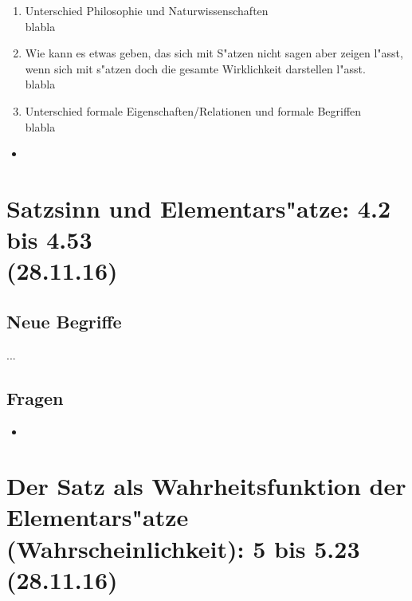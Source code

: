 \documentclass[emulatestandardclasses]{scrartcl}
\begin{document}
\begin{enumerate}
  \item {\color{NavyBlue}Unterschied Philosophie und Naturwissenschaften}\\
{\color{ForestGreen} blabla}
  \item {\color{NavyBlue} Wie kann es etwas geben, das sich mit S"atzen nicht sagen aber zeigen l"asst, wenn sich mit s"atzen doch die gesamte Wirklichkeit darstellen l"asst.}\\
{\color{ForestGreen} blabla}
    \item {\color{NavyBlue} Unterschied formale Eigenschaften/Relationen und formale Begriffen}\\
{\color{ForestGreen} blabla}
\end{enumerate}







\begin{itemize}
  \item 
\end{itemize}


\section{Satzsinn und Elementars"atze: 4.2 bis 4.53\\(28.11.16)}

\vspace{10pt}
\subsection{Neue Begriffe}


\begin{description}[leftmargin=!,labelwidth=\widthof{\bfseries Sachverhalt}]
  \item[Bild] ...
  \item[Tatsache] 
\end{description}

\subsection{Fragen}

\begin{itemize}
  \item 
\end{itemize}


\section{Der Satz als Wahrheitsfunktion der Elementars"atze (Wahrscheinlichkeit): 5 bis 5.23\\(28.11.16)}
\end{document}
